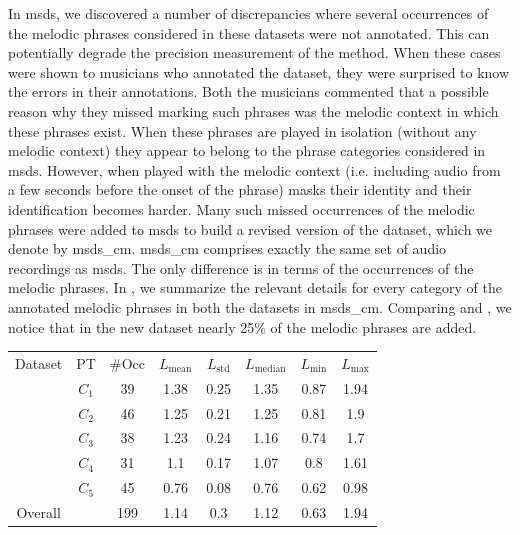 {{{In \acrshort{msds}, we discovered a number of discrepancies where several occurrences of the melodic phrases considered in these datasets were not annotated. This can potentially degrade the precision measurement of the method. When these cases were shown to musicians who annotated the dataset, they were surprised to know the errors in their annotations. Both the musicians commented that a possible reason why they missed marking such phrases was the melodic context in which these phrases exist. When these phrases are played in isolation (without any melodic context) they appear to belong to the phrase categories considered in \acrshort{msds}. However, when played with the melodic context (i.e. including audio from a few seconds before the onset of the phrase) masks their identity and their identification becomes harder. Many such missed occurrences of the melodic phrases were added to \acrshort{msds} to build a revised version of the dataset, which we denote by \acrshort{msds_cm}. \acrshort{msds_cm} comprises exactly the same set of audio recordings as \acrshort{msds}. The only difference is in terms of the occurrences of the melodic phrases. In , we summarize the relevant details for every category of the annotated melodic phrases in both the datasets in \acrshort{msds_cm}. Comparing  and , we notice that in the new dataset nearly 25\% of the melodic phrases are added.%


{\renewcommand{\arraystretch}{1.5}
	\begin{table} 
		\begin{centering}
			\begin{tabular}{ c c|c c c c c c}
				\tabletop
				Dataset	& PT 	&	\#Occ & $L_{\mathrm{mean}}$ & $L_{\mathrm{std}}$ &	$L_{\mathrm{median}}$ & $L_{\mathrm{min}}$ 	&	$L_{\mathrm{max}}$\\
				\tablemid
				\multirow{5}{*}{\acrshort{msds_cm_cmd}} 
				& $C_1$ & 39 & 1.38 & 0.25 & 1.35 & 0.87 & 1.94\\
				& $C_2$ & 46 & 1.25 & 0.21 & 1.25 & 0.81 & 1.9\\
				& $C_3$ & 38 & 1.23 & 0.24 & 1.16 & 0.74 & 1.7\\
				& $C_4$ & 31 & 1.1  & 0.17 & 1.07 & 0.8  & 1.61\\
				& $C_5$ & 45 & 0.76 & 0.08 & 0.76 & 0.62 & 0.98\\
				\tablemid
				Overall	&  	& 199& 1.14 & 0.3  & 1.12 & 0.63 & 1.94\\
				

\end{tabular}
\end{centering}
\end{table}}}}}
